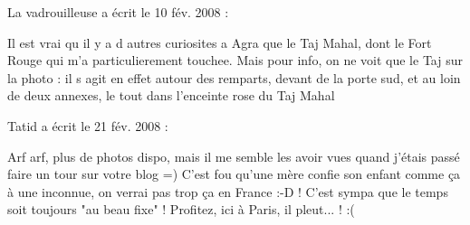 \medskip
La vadrouilleuse a écrit le 10 fév. 2008 :
\begin{displayquote}
Il est vrai qu il y a d autres curiosites a Agra que le Taj Mahal, dont le Fort Rouge qui m'a particulierement touchee. Mais pour info, on ne voit que le Taj sur la photo : il s agit en effet autour des remparts, devant de la porte sud, et au loin de deux annexes, le tout dans l'enceinte rose du Taj Mahal
\end{displayquote}

\medskip
Tatid a écrit le 21 fév. 2008 :
\begin{displayquote}
Arf arf, plus de photos dispo, mais il me semble les avoir vues quand j'étais passé faire un tour sur votre blog =)
C'est fou qu'une mère confie son enfant comme ça à une inconnue, on verrai pas trop ça en France :-D ! C'est sympa que le temps soit toujours "au beau fixe" ! Profitez, ici à Paris, il pleut... ! :(
\end{displayquote}

\vfill
